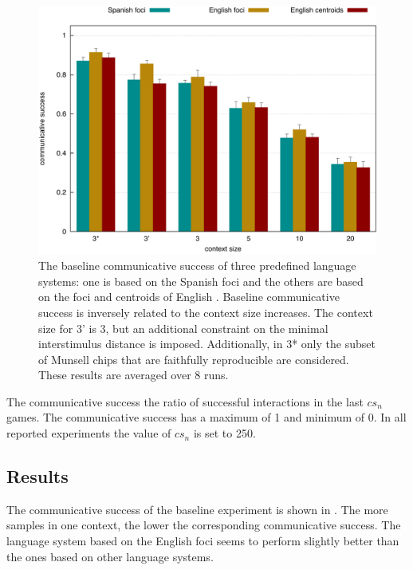 \begin{figure}[p]
  \begin{center}
    \includegraphics[width=.8\textwidth]{./basic-strategy/figures/baseline.pdf}
    \caption[The baseline communicative success of three predefined
    language systems]{The baseline communicative success of three
      predefined language systems: one is based on the Spanish foci
      \citep{lillo07locating} and the others are based on the foci and
      centroids of English \citep{sturges95location}. Baseline
      communicative success is inversely related to the context size
      increases. The context size for 3' is 3, but an additional
      constraint on the minimal interstimulus distance is
      imposed. Additionally, in 3* only the subset of Munsell chips
      that are faithfully reproducible are considered. These results
      are averaged over 8 runs.}
    \label{f:bcs-baseline}
  \end{center}
\end{figure}

The communicative success
the ratio of
successful interactions in the last $cs_n$ games. The communicative
success has a maximum of 1 and minimum of 0. In all reported
experiments the value of $cs_n$ is set to 250.

\subsection{Results}

The communicative success of the baseline experiment is shown in
. The more samples in one
context, the lower the corresponding communicative success. The
language system based on the English foci seems to perform slightly
better than the ones based on other language systems.


